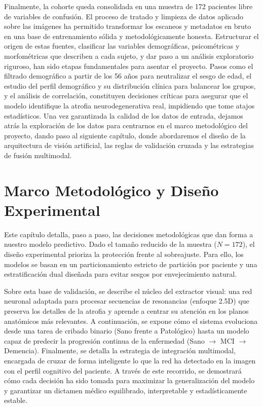\documentclass[12pt, oneside, english, spanish]{book}
\begin{document}
Finalmente, la cohorte queda consolidada en una muestra de 172 pacientes libre de variables de confusión. El proceso de tratado y limpieza de datos aplicado sobre las imágenes ha permitido transformar los escaneos y metadatos en bruto en una base de entrenamiento sólida y metodológicamente honesta. Estructurar el origen de estas fuentes, clasificar las variables demográficas, psicométricas y morfométricas que describen a cada sujeto, y dar paso a un análisis exploratorio riguroso, han sido etapas fundamentales para asentar el proyecto. Pasos como el filtrado demográfico a partir de los 56 años para neutralizar el sesgo de edad, el estudio del perfil demográfico y su distribución clínica para balancear los grupos, y el análisis de correlación, constituyen decisiones críticas para asegurar que el modelo identifique la atrofia neurodegenerativa real, impidiendo que tome atajos estadísticos. Una vez garantizada la calidad de los datos de entrada, dejamos atrás la exploración de los datos para centrarnos en el marco metodológico del proyecto, dando paso al siguiente capítulo, donde abordaremos el diseño de la arquitectura de visión artificial, las reglas de validación cruzada y las estrategias de fusión multimodal.

\chapter{Marco Metodológico y Diseño Experimental} \label{chap:metodologia}

Este capítulo detalla, paso a paso, las decisiones metodológicas que dan forma a nuestro modelo predictivo. Dado el tamaño reducido de la muestra ($N = 172$), el diseño experimental prioriza la protección frente al sobreajuste. Para ello, los modelos se basan en un particionamiento estricto de partición por paciente y una estratificación dual diseñada para evitar sesgos por envejecimiento natural.

Sobre esta base de validación, se describe el núcleo del extractor visual: una red neuronal adaptada para procesar secuencias de resonancias (enfoque 2.5D) que preserva los detalles de la atrofia y aprende a centrar su atención en los planos anatómicos más relevantes. A continuación, se expone cómo el sistema evoluciona desde una tarea de cribado binario (Sano frente a Patológico) hasta un modelo capaz de predecir la progresión continua de la enfermedad (Sano $\rightarrow$ MCI $\rightarrow$ Demencia). Finalmente, se detalla la estrategia de integración multimodal, encargada de cruzar de forma inteligente lo que la red ha detectado en la imagen con el perfil cognitivo del paciente. A través de este recorrido, se demostrará cómo cada decisión ha sido tomada para maximizar la generalización del modelo y garantizar un dictamen médico equilibrado, interpretable y estadísticamente estable.
\end{document}
